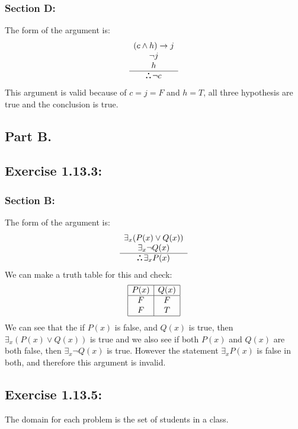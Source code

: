 \documentclass[titlepage]{article}\pagestyle{empty}
\def\therefore{\boldsymbol{\text{ }
\leavevmode
\lower0.4ex\hbox{$\cdot$}
\kern-.5em\raise0.7ex\hbox{$\cdot$}
\kern-0.55em\lower0.4ex\hbox{$\cdot$}
\thinspace\text{ }}}
\begin{document}
\subsubsection*{Section D:}
The form of the argument is:
\begin{displaymath}
\begin{array}{c}
(c \land h) \to j\\
\neg j\\
h\\
\hline
\therefore \neg c
\end{array}
\end{displaymath}
This argument is valid because of $c = j = F$ and $h = T$, all three hypothesis are true and the conclusion is true.

\pagebreak
\subsection*{Part B.}
\subsection*{Exercise 1.13.3:}
\subsubsection*{Section B:}
The form of the argument is:
\begin{displaymath}
\begin{array}{c}
\exists_x (P(x) \lor Q(x))\\
\exists_x \neg Q(x)\\
\hline
\therefore \exists_x P(x)
\end{array}
\end{displaymath}
We can make a truth table for this and check:
\begin{displaymath}
\begin{array}{|c|c|}
\hline
P(x) & Q(x)\\
\hline
F & F\\
F & T\\
\hline
\end{array}
\end{displaymath}
We can see that the if $P(x)$ is false, and $Q(x)$ is true, then $\exists_x (P(x) \lor Q(x))$ is true and we also see if both $P(x)$ and $Q(x)$ are both false, then $\exists_x \neg Q(x)$ is true. However the statement $\exists_x P(x)$ is false in both, and therefore this argument is invalid.
\subsection*{Exercise 1.13.5:}
The domain for each problem is the set of students in a class.
\end{document}
